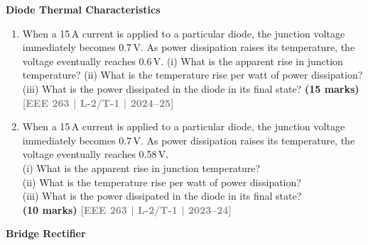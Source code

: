\documentclass[12pt,a4paper]{article}
\newcommand{\yr}[1]{\hfill\textcolor{gray}{\small\textbf{[#1]}}}
\newcommand{\mk}[1]{\textcolor{orange!70!black}{\small\textbf{(#1 marks)}}}
\newcommand{\subtopic}[2]{%
  \vspace{10pt}
  \noindent\begin{tcolorbox}[colback=#1!8,colframe=#1,boxrule=0.6pt,arc=4pt,
    left=6pt,right=6pt,top=4pt,bottom=4pt]
    \small\bfseries\textcolor{#1}{#2}
  \end{tcolorbox}
  \vspace{2pt}
}
\begin{document}
\subtopic{cA}{Diode Thermal Characteristics}
\label{sub:s1-thermal}

\begin{enumerate}

\item When a 15\,A current is applied to a particular diode, the junction voltage immediately becomes 0.7\,V. As power dissipation raises its temperature, the voltage eventually reaches 0.6\,V. (i) What is the apparent rise in junction temperature? (ii) What is the temperature rise per watt of power dissipation? (iii) What is the power dissipated in the diode in its final state?
\mk{15} \yr{EEE 263 | L-2/T-1 | 2024--25}

\item When a 15\,A current is applied to a particular diode, the junction voltage immediately becomes 0.7\,V. As power dissipation raises its temperature, the voltage eventually reaches 0.58\,V.\\
 (i) What is the apparent rise in junction temperature? \\
 (ii) What is the temperature rise per watt of power dissipation? \\
 (iii) What is the power dissipated in the diode in its final state?\\
\mk{10} \yr{EEE 263 | L-2/T-1 | 2023--24}

\end{enumerate}

\subtopic{cA}{Bridge Rectifier}
\label{sub:s1-rectifier}
\end{document}

